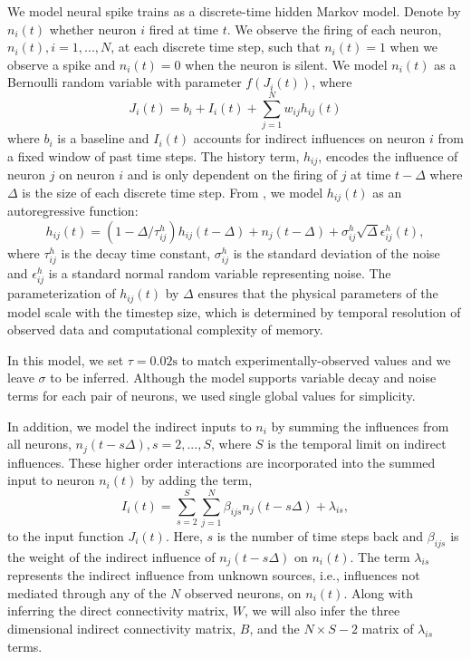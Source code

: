 \documentclass{article}
\begin{document}
We model neural spike trains as a discrete-time hidden Markov model.
Denote by $ n_i(t) $ whether neuron $i$ fired at time $t$. We observe
the firing of each neuron, $n_i(t), i = 1,...,N$, at each discrete
time step, such that $n_i(t) = 1$ when we observe a spike and $n_i(t)
= 0$ when the neuron is silent. We model $n_i(t)$ as a Bernoulli
random variable with parameter $f(J_i(t))$, where
\begin{equation}
\label{J} J_i(t) = b_i + I_i(t) + \sum_{j=1}^{N} w_{ij}h_{ij}(t)
\end{equation}
where $b_i$ is a baseline and $I_i(t)$ accounts for indirect
influences on neuron $i$ from a fixed window of past time steps.
The history term, $h_{ij}$, encodes the influence of neuron $j$ on
neuron $i$ and is only dependent on the firing of $j$ at time
$t-\Delta$ where $\Delta$ is the size of each discrete time step.
From \citep{mishchencko2011}, we model $h_{ij}(t)$ as an autoregressive
function:
\begin{equation}
\label{h} h_{ij}(t) = (1-\Delta/\tau_{ij}^h)h_{ij}(t-\Delta)
  + n_j(t-\Delta)+\sigma_{ij}^h\sqrt{\Delta}\epsilon_{ij}^h(t),
\end{equation}
where $ \tau_{ij}^h $ is the decay time constant, $\sigma_{ij}^h$
is the standard deviation of the noise and $\epsilon_{ij}^h$ is a
standard normal random variable representing noise.  The parameterization
of $h_{ij}(t)$ by $\Delta$ ensures that the physical parameters of
the model scale with the timestep size, which is determined by
temporal resolution of observed data and computational complexity
of memory.

In this model, we set $\tau = 0.02\text{s}$ to match
experimentally-observed values \citep{mischenko2011} and we leave
$\sigma$ to be inferred. Although the model supports variable decay
and noise terms for each pair of neurons, we used single global
values for simplicity.


In addition, we model the indirect inputs to $n_i$ by summing the
influences from all neurons, $n_j(t-s\Delta), s=2,...,S$, where $S$
is the temporal limit on indirect influences. These higher order
interactions are incorporated into the summed input to neuron
$n_i(t)$ by adding the term,
\begin{equation}
\label{new_term}
I_i(t)=\displaystyle\sum\limits_{s=2}^S\sum\limits_{j=1}^N \beta_{ijs}n_j(t-s\Delta) + \lambda_{is},
\end{equation}
to the input function $J_i(t)$. Here, $s$ is the number of time steps back and $\beta_{ijs}$ is the weight of the indirect influence of $n_j(t-s\Delta)$ on $n_i(t)$. The term $\lambda_{is}$ represents the indirect influence from unknown sources, i.e., influences not mediated through any of the $N$ observed neurons, on $n_i(t)$.  Along with inferring the direct connectivity matrix, $W$, we will also infer the three dimensional indirect connectivity matrix, $B$, and the $N\times S-2$ matrix of $\lambda_{is}$ terms.
\end{document}

